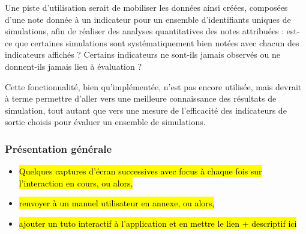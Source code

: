 Une piste d'utilisation serait de mobiliser les données ainsi créées, composées d'une note donnée à un indicateur pour un ensemble d'identifiants uniques de simulations, afin de réaliser des analyses quantitatives des notes attribuées : est-ce que certaines simulations sont systématiquement bien notées avec chacun des indicateurs affichés ? Certains indicateurs ne sont-ils jamais observés ou ne donnent-ils jamais lieu à évaluation ?

Cette fonctionnalité, bien qu'implémentée, n'est pas encore utilisée, mais devrait à terme permettre d'aller vers une meilleure connaissance des résultats de simulation, tout autant que vers une mesure de l'efficacité des indicateurs de sortie choisis pour évaluer un ensemble de simulations.

\subsubsection{Présentation générale}

\begin{itemize}
\item \hl{Quelques captures d'écran successives avec focus à chaque fois sur l'interaction en cours, ou alors,}
\item \hl{renvoyer à un manuel utilisateur en annexe, ou alors,}
\item \hl{ajouter un tuto interactif à l'application et en mettre le lien + descriptif ici}
\end{itemize}
